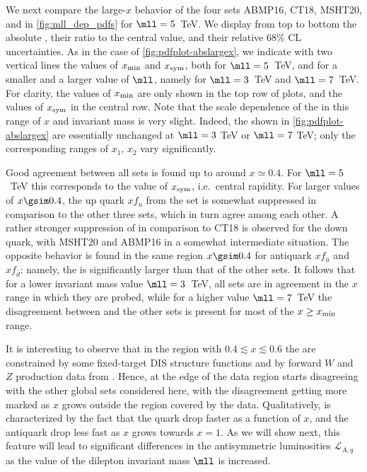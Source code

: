 We next compare the large-$x$ behavior 
of the four \pdf sets ABMP16, CT18, MSHT20, and  in \cref{fig:mll_dep_pdfs}
for $\mll=5$~TeV.
%
We display from top to bottom the absolute \pdfs, their ratio to the central  value, and
their relative 68\% CL uncertainties.
%
As in the case of \cref{fig:pdfplot-abslargex}, we indicate with two vertical lines
the values of $x_{\rm min}$ and $x_{\rm  sym}$,
both for $\mll=5$~TeV, and for a smaller and a larger value of $\mll$,
namely for $\mll=3$~TeV and  $\mll=7$~TeV.
%
For clarity, the values of $x_{\rm min}$ are only shown 
in the top row of plots, and the values of  $x_{\rm  sym}$ in the
central row. Note that the scale dependence
of the \pdfs in this range of  $x$ and invariant mass is very
slight. Indeed, the \pdfs shown in \cref{fig:pdfplot-abslargex} are
essentially unchanged at $\mll=3$ TeV or  $\mll=7$ TeV;  only the
corresponding ranges of $x_1$, $x_2$ vary significantly.

Good agreement between all \pdf
sets is found up to around $x\simeq 0.4$.
%
For $\mll=5$~TeV this corresponds to the value of $x_{\rm sym}$, i.e.\ central rapidity.
%
For larger values of $x\gsim 0.4$, the up  quark \pdf $xf_u$ from the
 set is somewhat
suppressed in comparison to the other three sets, which in turn agree
among each other.
%
A rather stronger suppression of
  in comparison to  CT18 is observed for the down quark, with
MSHT20 and ABMP16 in a somewhat intermediate situation.
%
The opposite behavior is found in the same region $x\gsim 0.4$ for
antiquark \pdfs  $xf_{\bar{u}}$ and $xf_{\bar{d}}$:
namely, the  \pdf is significantly  larger than that of the other sets.
It follows that for a lower invariant mass value  $\mll = 3$~TeV, all
\pdf sets are  in agreement in the $x$ range in which they are probed,
while for a higher value  $\mll = 7$~TeV the 
disagreement between  and the other \pdf sets is present for
most of the $x\ge x_{\rm min}$ range.

It is interesting to observe that in the region with $0.4\lesssim x\lesssim
0.6$ the \pdfs are constrained by some fixed-target DIS structure functions and
by forward $W$ and $Z$ production data from \lhcb.
Hence, at the edge of the data region  starts disagreeing with the
other global \pdf sets considered here, with the disagreement getting more
marked as $x$ grows outside the region covered by the data.
%
Qualitatively,  is characterized by the fact that the
quark \pdfs drop faster as a function of $x$, and the antiquark \pdfs
drop less fast as $x$ grows towards $x=1$.
As we will show next, this feature will lead to significant differences
in the antisymmetric \pdf luminosities $\mathcal{L}_{A,q}$ as the value of
the dilepton invariant mass $\mll$ is increased.

